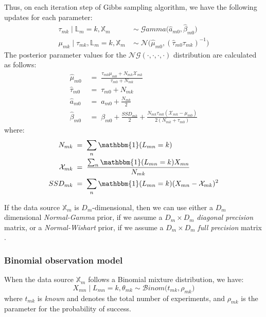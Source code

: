 Thus, on each iteration step of Gibbs sampling algorithm, we have the following updates for each parameter:
\begin{equation}
  \begin{aligned}
  	\tau_{mk} \mid \mathbb{L}_{m}=k, \mathbb{X}_{m} \;& \sim \;\mathcal{G}amma\big(\hat{\mathit{a}}_{m0}, \hat{\beta}_{m0}\big) \\
	\mu_{mk} \mid \tau_{mk}, \mathbb{L}_{m}=k, \mathbb{X}_{m} \; & \sim \; \mathcal{N}\big(\hat{\mu}_{m0}, (\hat{\tau}_{m0} \tau_{mk})^{-1}\big)
  \end{aligned}
\end{equation}
The posterior parameter values for the $\mathcal{NG}(\cdot,\cdot,\cdot,\cdot)$ distribution are calculated as follows:
\begin{equation}
  \begin{aligned}
  	\hat{\mu}_{m0} \; &= \; \frac{\tau_{m0}\mu_{m0} + N_{mk}\mathcal{X}_{mk}}{\tau_{m0} + N_{mk}}\\
  	\hat{\tau}_{m0} \; &= \; \tau_{m0} + N_{mk}\\
  	\hat{\mathit{a}}_{m0} \; &= \; \mathit{a}_{m0} + \frac{N_{mk}}{2}\\
  	\hat{\beta}_{m0} \; &= \; \beta_{m0} + \frac{SSD_{mk}}{2} + \frac{N_{mk}\tau_{m0}(\mathcal{X}_{mk} - \mu_{m0})}{2(N_{mk}+\tau_{m0})}
  \end{aligned}
\end{equation}
where: 
\begin{equation}
  \begin{aligned}
		N_{mk} \; &= \; \sum_{n}\mathbbm{1}(L_{mn}=k)\\ 
		\mathcal{X}_{mk} \; &= \; \frac{\sum_{n}\mathbbm{1}(L_{mn}=k)X_{mn}}{N_{mk}} \\
		SSD_{mk} \; &= \; \sum_{n}\mathbbm{1}(L_{mn}=k)(X_{mn}-\mathcal{X}_{mk})^{2}
  \end{aligned}
\end{equation} 

If the data source $\mathbb{X}_{m}$ is $D_{m}$-dimensional, then we can use either a $D_{m}$ dimensional \emph{Normal-Gamma} prior, if we assume a $D_{m} \times D_{m}$ \emph{diagonal precision} matrix, or a \emph{Normal-Wishart} prior, if we assume a $D_{m} \times D_{m}$ \emph{full precision} matrix \cite[Ch. 2]{Bishop2006}.

\subsubsection*{Binomial observation model}
When the data source $\mathbb{X}_{m}$ follows a Binomial mixture distribution, we have:
\begin{equation}
	X_{mn} \mid L_{mn} = k, \theta_{mk} \sim \mathcal{B}inom\big(t_{mk}, \rho_{mk}\big)
\end{equation}
where $t_{mk}$ is \emph{known} and denotes the total number of experiments, and $\rho_{mk}$ is the parameter for the probability of success.

